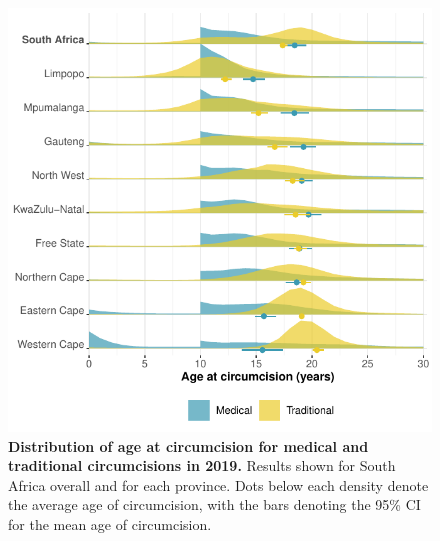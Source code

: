 \documentclass{article}
\begin{document}
\begin{figure}[H]
  \centering
  \includegraphics[width = 5.0in]{Figures/paper/Figure8.pdf}
  \caption{{\bf Distribution of age at circumcision for medical and traditional circumcisions in 2019.} Results shown for South Africa overall and for each province. Dots below each density denote the average age of circumcision, with the bars denoting the 95\% CI for the mean age of circumcision.}
  \label{fig::avgageofcirc}
\end{figure}






\textwidth 7.25in
\end{document}
